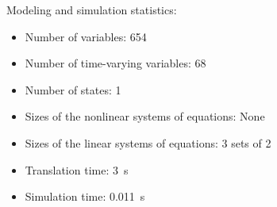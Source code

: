 \begin{contextbox}
  Modeling and simulation statistics:
  \begin{itemize}
    \item Number of variables: 654
    \item Number of time-varying variables: 68
    \item Number of states: 1
    \item Sizes of the nonlinear systems of equations: None
    \item Sizes of the linear systems of equations: 3 sets of 2
    \item Translation time: \SI{3}{s}
    \item Simulation time: \SI{0.011}{s}
  \end{itemize}
\end{contextbox}